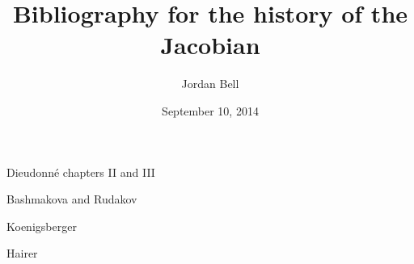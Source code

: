 \documentclass{article}
\begin{document}
\title{Bibliography for the history of the Jacobian}
\author{Jordan Bell}
\date{September 10, 2014}
\maketitle


Dieudonn\'e chapters II and III \cite{abregeI}

Bashmakova and Rudakov \cite[p.~82]{bashmakova}

Koenigsberger \cite[pp.~173, 270, 342, 344, 401]{koenigsberger}

Hairer \cite[p.~66]{hairer}


\nocite{*}



\end{document}
